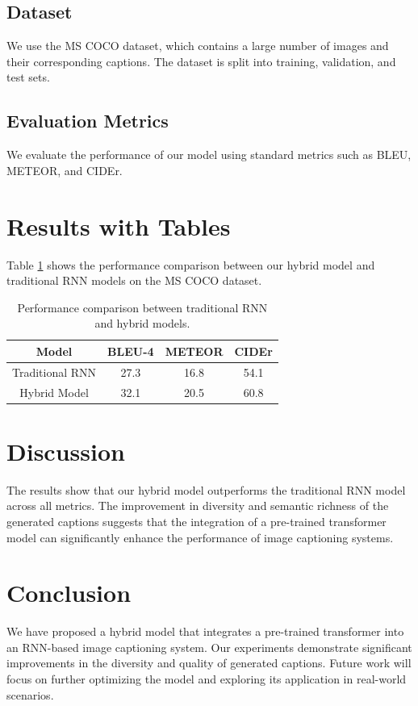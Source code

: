 \documentclass{article}
\begin{document}
\subsection{Dataset}
We use the MS COCO dataset, which contains a large number of images and their corresponding captions. The dataset is split into training, validation, and test sets.

\subsection{Evaluation Metrics}
We evaluate the performance of our model using standard metrics such as BLEU, METEOR, and CIDEr.

\section{Results with Tables}
Table \ref{tab:results} shows the performance comparison between our hybrid model and traditional RNN models on the MS COCO dataset.

\begin{table}[htbp]
\centering
\begin{tabular}{|c|c|c|c|}
\hline
Model & BLEU-4 & METEOR & CIDEr \\
\hline
Traditional RNN & 27.3 & 16.8 & 54.1 \\
Hybrid Model & 32.1 & 20.5 & 60.8 \\
\hline
\end{tabular}
\caption{Performance comparison between traditional RNN and hybrid models.}
\label{tab:results}
\end{table}

\section{Discussion}
The results show that our hybrid model outperforms the traditional RNN model across all metrics. The improvement in diversity and semantic richness of the generated captions suggests that the integration of a pre-trained transformer model can significantly enhance the performance of image captioning systems.

\section{Conclusion}
We have proposed a hybrid model that integrates a pre-trained transformer into an RNN-based image captioning system. Our experiments demonstrate significant improvements in the diversity and quality of generated captions. Future work will focus on further optimizing the model and exploring its application in real-world scenarios.
\end{document}
